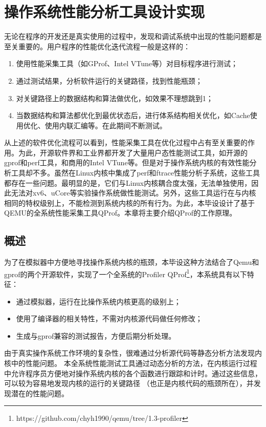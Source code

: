 


\chapter{操作系统性能分析工具设计实现}

无论在程序的开发还是真实使用的过程中，发现和调试系统中出现的性能问题都是至关重要的。用户程序的性能优化迭代流程一般是这样的：
\begin{enumerate}
\item 使用性能采集工具（如GProf、Intel VTune等）对目标程序进行测试；
\item 通过测试结果，分析软件运行的关键路径，找到性能瓶颈；
\item 对关键路径上的数据结构和算法做优化，如效果不理想跳到1；
\item
当数据结构和算法都优化到最优状态后，进行体系结构相关优化，如Cache使用优化、使用内联汇编等。在此期间不断测试。
\end{enumerate}

从上述的软件优化流程可以看到，性能采集工具在优化过程中占有至关重要的作用。为此，开源软件界和工业界都开发了大量用户态性能测试工具，如开源的gprof和perf工具，和商用的Intel
VTune等。但是对于操作系统内核的有效性能分析工具却不多。虽然在Linux内核中集成了perf和ftrace性能分析子系统，这些工具都存在一些问题。最明显的是，它们与Linux内核耦合度太强，无法单独使用，因此无法对xv6、uCore等实验操作系统做性能测试。另外，这些工具运行在与内核相同的特权级别上，不能检测到系统内核的所有行为。为此，本毕设设计了基于QEMU的全系统性能采集工具QProf。本章将主要介绍QProf的工作原理。

\section{概述}
为了在模拟器中方便地寻找操作系统内核的瓶颈，本毕设这种方法结合了Qemu和gprof的两个开源软件，实现了一个全系统的Profiler
\pozhehao
QProf\footnote{https://github.com/chyh1990/qemu/tree/1.3-profiler}，本系统具有以下特征：
\begin{itemize}
\item 通过模拟器，运行在比操作系统内核更高的级别上；
\item 使用了编译器的相关特性，不需对内核源代码做任何修改；
\item 生成与gprof兼容的测试报告，方便后期分析处理。
\end{itemize}

由于真实操作系统工作环境的复杂性，很难通过分析源代码等静态分析方法发现内核中的性能问题。
本全系统性能测试工具通过动态分析的方法，在内核运行过程中允许程序员方便地对操作系统内核的各个函数进行跟踪和计时。通过这些信息，可以较为容易地发现内核的运行的关键路径
（也正是内核代码的瓶颈所在），并发现潜在的性能问题。

